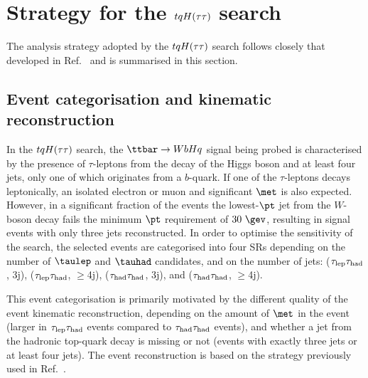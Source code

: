 \section{Strategy for the $tqH(\tau\tau)$ search}
\label{sec:strategy_Htautau}

The analysis strategy adopted by the $tqH(\tau\tau)$ search follows closely that developed in Ref.~\cite{Chen:2015nta} and is summarised in this section.

\subsection{Event categorisation and kinematic reconstruction}
\label{sec:htautau_reco_cat}

In the $tqH(\tau\tau)$ search, the $\ttbar \to WbHq$ signal being probed is characterised by the presence of $\tau$-leptons from the decay of 
the Higgs boson and at least four jets, only one of which originates from a $b$-quark.
If one of the $\tau$-leptons decays leptonically, an isolated electron or muon and significant $\met$ is also expected.
However, in a significant fraction of the events the lowest-$\pt$ jet from the $W$-boson decay fails the minimum $\pt$ requirement of $30~\gev$,
resulting in signal events with only three jets reconstructed.
In order to optimise the sensitivity of the search, the selected events are categorised into four SRs depending 
on the number of $\taulep$ and $\tauhad$ candidates, and on the number of jets:
($\tau_{\mathrm{lep}} \tau_{\mathrm{had}}$, 3j), ($\tau_{\mathrm{lep}} \tau_{\mathrm{had}}$, $\geq$4j), ($\tau_{\mathrm{had}} \tau_{\mathrm{had}}$, 3j), and ($\tau_{\mathrm{had}} \tau_{\mathrm{had}}$, $\geq$4j). 

This event categorisation is primarily motivated by the different quality of the event kinematic reconstruction, depending on the amount 
of $\met$ in the event (larger in $\tau_{\mathrm{lep}} \tau_{\mathrm{had}}$ events compared to $\tau_{\mathrm{had}} \tau_{\mathrm{had}}$ events), and whether a jet from the hadronic top-quark decay 
is missing or not (events with exactly three jets or at least four jets).
The event reconstruction is based on the strategy previously used in Ref.~\cite{Chen:2015nta}.

